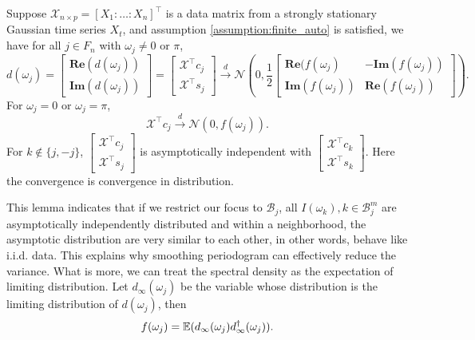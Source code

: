 \begin{lem}
\label{lemma:asy_dis_dft}
Suppose $\mathcal{\mathcal{X}}_{n\times p} = [X_1:\ldots:X_n]^\top$ is a data matrix from a strongly stationary  Gaussian time series $X_t$, and assumption \ref{assumption:finite_auto} is satisfied, we have for all $j\in F_n$ with $\omega_j \neq 0$ or $\pi$, 
\begin{equation}
\label{eq:limiting_dist}
d(\omega_j) = 
\begin{bmatrix}
\mathbf{Re}(d(\omega_j))\\
\mathbf{Im}(d(\omega_j))
\end{bmatrix}=
\begin{bmatrix} 
\mathcal{X}^\top c_j\\
\mathcal{X}^\top s_j
\end{bmatrix}  \overset{d}{\rightarrow} \mathcal{N}\left(0, \frac{1}{2}\begin{bmatrix}
\mathbf{Re}(f(\omega_j) & -\mathbf{Im}(f(\omega_j))\\
\mathbf{Im}(f(\omega_j)) & \mathbf{Re}(f(\omega_j))
\end{bmatrix}
\right).
\end{equation}
For $\omega_j = 0$ or $\omega_j = \pi$, 
\begin{equation}
\mathcal{X}^\top c_j
\overset{d}{\rightarrow} \mathcal{N}\left(0, f(\omega_j)
\right).
\end{equation}
For $k \notin \{j, -j\}$,  
$\begin{bmatrix}
\mathcal{X}^\top c_j\\
\mathcal{X}^\top s_j
\end{bmatrix}$ is asymptotically independent with 
$\begin{bmatrix}
\mathcal{X}^\top c_k\\
\mathcal{X}^\top s_k
\end{bmatrix} $. Here the convergence is convergence in distribution. 
\end{lem} 
This lemma indicates that if we restrict our focus to $\mathcal{B}_j$, all $I(\omega_k), k\in \mathcal{B}_j^m$ are asymptotically independently distributed and within a neighborhood, the asymptotic distribution are very similar to each other, in other words, behave like i.i.d. data. This explains why smoothing periodogram can effectively reduce the variance. What is more, we can treat the spectral density as the expectation of limiting distribution. Let 
$d_{\infty}(\omega_j)$ be the variable whose distribution is the limiting distribution of $d(\omega_j)$, then 
\[
f(\omega_j) = \mathbb{E}(d_{\infty}(\omega_j)d^\dag_{\infty}(\omega_j)).
\]


